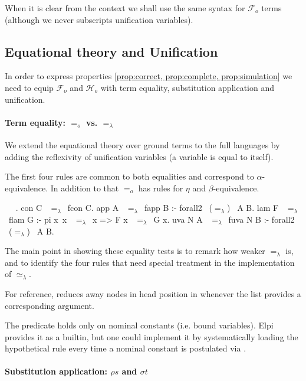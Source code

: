 \documentclass[sigconf,natbib=false,review]{acmart}
\newcommand{\EqualRel}{\ensuremath{=}}
\newcommand{\UnifRel}{\ensuremath{\simeq}}
\newcommand{\Eo}{\ensuremath{\EqualRel_o}\xspace}
\newcommand{\Ue}{\ensuremath{\UnifRel_\lambda}\xspace}
\newcommand{\Ee}{\ensuremath{\EqualRel_\lambda}\xspace}
\newcommand{\Fo}{\ensuremath{\mathcal{F}_{\!o}\xspace}} %
\newcommand{\Ho}{\ensuremath{\mathcal{H}_o}\xspace}
\begin{document}
\noindent
When it is clear from the context we shall use the same syntax for \Fo{} terms
(although we never subscripts unification variables).

\subsection{Equational theory and Unification}

In order to express properties \ref{prop:correct, prop:complete, prop:simulation}
we need to equip \Fo{} and \Ho with term equality,
substitution application and unification.

\paragraph{Term equality: \Eo vs. \Ee} We extend the equational theory
over ground terms to the full languages by adding the reflexivity of
unification variables (a variable is equal to itself).

The first four rules are common to both equalities and correspond to $\alpha$-equivalence.
In addition to that \Eo has rules for $\eta$ and $\beta$-equivalence.



\begin{elpicode}
  ~ \PYG{n+nf}{(\Ee)} ~.
  con C ~\Ee~fcon C.
  app A ~\Ee~fapp B :- forall2 ~(\Ee)~ A B.
  lam F ~\Ee~flam G :- pi x\ x ~\Ee~x => F x ~\Ee~G x.
  uva N A ~\Ee~fuva N B :- forall2 ~(\Ee)~ A B.
\end{elpicode}

\noindent
The main point in showing these equality tests is to remark how weaker \Ee is,
and to identify the four rules that need special treatment in
the implementation of \Ue.

For reference,  reduces away  nodes in head
position in  whenever the list  provides a corresponding
argument.



\noindent
The  predicate holds only on nominal constants (i.e. bound
variables). Elpi provides it as a builtin, but one could implement it by
systematically loading the hypothetical rule  every time
a nominal constant is postulated via .

\paragraph{Substitution application: $\rho s$ and $\sigma t$}
\end{document}
